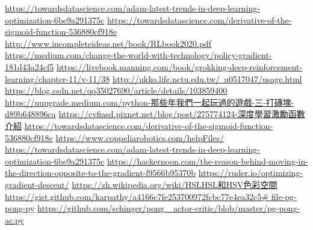 \newpage
\renewcommand\bibname{參~考~文~獻}
\begin{thebibliography}{99}  %
\href{https://towardsdatascience.com/adam-latest-trends-in-deep-learning-optimization-6be9a291375c}{https://towardsdatascience.com/adam-latest-trends-in-deep-learning-optimization-6be9a291375c}
\href{https://towardsdatascience.com/derivative-of-the-sigmoid-function-536880cf918e}{https://towardsdatascience.com/derivative-of-the-sigmoid-function-536880cf918e}
\href{http://www.incompleteideas.net/book/RLbook2020.pdf}{http://www.incompleteideas.net/book/RLbook2020.pdf}
\href{https://medium.com/change-the-world-with-technology/policy-gradient-181d43a24cf5}{https://medium.com/change-the-world-with-technology/policy-gradient-181d43a24cf5}
\href{https://livebook.manning.com/book/grokking-deep-reinforcement-learning/chapter-11/v-11/38}{https://livebook.manning.com/book/grokking-deep-reinforcement-learning/chapter-11/v-11/38}
\href{http://ukko.life.nctu.edu.tw/~u0517047/usage.html}{http://ukko.life.nctu.edu.tw/~u0517047/usage.html}
\href{https://blog.csdn.net/qq_35027690/article/details/103859400}{https://blog.csdn.net/qq35027690/article/details/103859400}
\href{https://uupgrade.medium.com/python-那些年我們一起玩過的遊戲-三-打磚塊-d89b648896ca}{https://uupgrade.medium.com/python-那些年我們一起玩過的遊戲-三-打磚塊-d89b648896ca}
\href{https://cvfiasd.pixnet.net/blog/post/275774124-深度學習激勵函數介紹}{https://cvfiasd.pixnet.net/blog/post/275774124-深度學習激勵函數介紹}
\href{https://towardsdatascience.com/derivative-of-the-sigmoid-function-536880cf918e}{https://towardsdatascience.com/derivative-of-the-sigmoid-function-536880cf918e}
\href{https://www.coppeliarobotics.com/helpFiles/}{https://www.coppeliarobotics.com/helpFiles/}
\href{https://towardsdatascience.com/adam-latest-trends-in-deep-learning-optimization-6be9a291375c}{https://towardsdatascience.com/adam-latest-trends-in-deep-learning-optimization-6be9a291375c}
\href{https://hackernoon.com/the-reason-behind-moving-in-the-direction-opposite-to-the-gradient-f9566b95370b}{https://hackernoon.com/the-reason-behind-moving-in-the-direction-opposite-to-the-gradient-f9566b95370b}\label{OGD}
\href{https://ruder.io/optimizing-gradient-descent/}{https://ruder.io/optimizing-gradient-descent/}
\label{OGD2}
\href{https://reurl.cc/gz0YjN}{https://zh.wikipedia.org/wiki/HSLHSL和HSV色彩空間}
\label{RGBtoHSV}
\href{https://reurl.cc/gzMm4N}{https://gist.github.com/karpathy/a4166c7fe253700972fcbc77e4ea32c5\# file-pg-pong-py}\label{R.pong1}
\href{https://reurl.cc/xEQ3Ge}{https://github.com/schinger/pong\_ actor-critic/blob/master/pg-pong-ac.py}\label{R.pong1.1}

%
\end{thebibliography}
\newpage